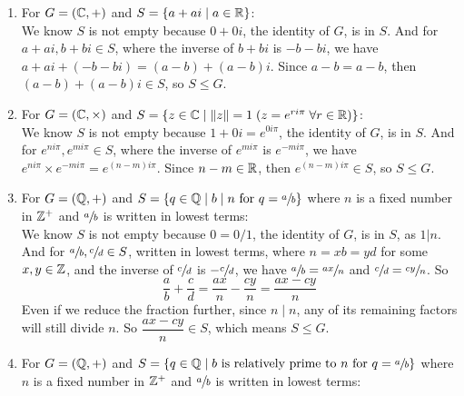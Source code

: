 \documentclass[12pt]{article}
\begin{document}
    \begin{enumerate}[label=\textbf{\alph*.}]
        \item 
            For $G = (\mathbb{C}, +)$ and $S = \{ a + ai \mid a \in \mathbb{R} \}$: \\
            We know $S$ is not empty because $0 + 0i$,
            the identity of $G$, is in $S$.
            And for $a + ai, b + bi \in S$,
            where the inverse of $b + bi$ is $-b -bi$,
            we have $a + ai + (-b -bi) = (a-b) + (a-b)i$.
            Since $a-b = a-b$,
            then $(a-b) + (a-b)i \in S$,
            so $S \leqslant G$.
        \item 
            For $G = (\mathbb{C}, \times)$ and $S = \{ z \in \mathbb{C} \mid \|z\| = 1
            \; (z = e^{ri\pi} \; \forall r \in \mathbb{R})\}$: \\
            We know $S$ is not empty because $1 + 0i = e^{0i\pi}$,
            the identity of $G$, is in $S$.
            And for $e^{ni\pi}, e^{mi\pi} \in S$,
            where the inverse of $e^{mi\pi}$ is $e^{-mi\pi}$,
            we have $e^{ni\pi} \times e^{-mi\pi} = e^{(n - m)i\pi}$.
            Since $n - m \in \mathbb{R}$,
            then $e^{(n - m)i\pi} \in S$,
            so $S \leqslant G$.
        \item 
            For $G = (\mathbb{Q}, +)$ and $S = \{ q \in \mathbb{Q} \mid b \mid n 
            \text{ for } q = \sfrac{a}{b} \}$
            where $n$ is a fixed number in $\mathbb{Z}^+$
            and $\sfrac{a}{b}$ is written in lowest terms: \\
            We know $S$ is not empty because $0 = 0/1$,
            the identity of $G$, is in $S$,
            as $1|n$.
            And for $\sfrac{a}{b}, \sfrac{c}{d} \in S$,
            written in lowest terms,
            where $n = xb = yd$ for some $x, y \in \mathbb{Z}$,
            and the inverse of $\sfrac{c}{d}$ is $-\sfrac{c}{d}$,
            we have $\sfrac{a}{b} = \sfrac{ax}{n}$
            and $\sfrac{c}{d} = \sfrac{cy}{n}$. 
            So \[\dfrac{a}{b} + \dfrac{c}{d} = 
            \dfrac{ax}{n} - \dfrac{cy}{n} = \dfrac{ax - cy}{n}\]
            Even if we reduce the fraction further, since $n \mid n$,
            any of its remaining factors will still divide $n$.
            So $\dfrac{ax - cy}{n} \in S$,
            which means $S \leqslant G$.
        \item 
            For $G = (\mathbb{Q}, +)$ and $S = \{ q \in \mathbb{Q} \mid b \text{ is
            relatively prime to $n$ for } q = \sfrac{a}{b} \}$
            where $n$ is a fixed number in $\mathbb{Z}^+$
            and $\sfrac{a}{b}$ is written in lowest terms: \\

\end{enumerate}
\end{document}

